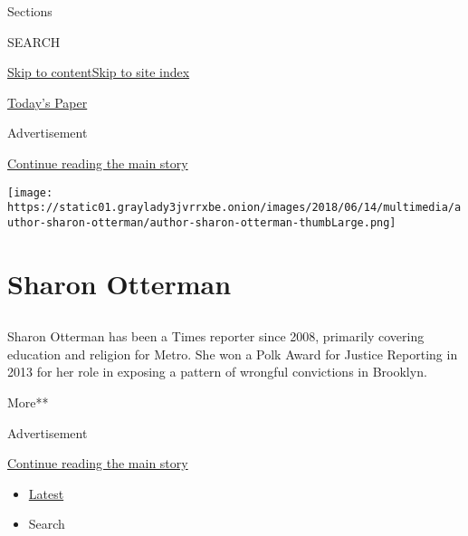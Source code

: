 Sections

SEARCH

\protect\hyperlink{site-content}{Skip to
content}\protect\hyperlink{site-index}{Skip to site index}

\href{https://myaccount.nytimes3xbfgragh.onion/auth/login?response_type=cookie\&client_id=vi}{}

\href{https://www.nytimes3xbfgragh.onion/section/todayspaper}{Today's
Paper}

Advertisement

\protect\hyperlink{after-top}{Continue reading the main story}

\texttt{[image: https://static01.graylady3jvrrxbe.onion/images/2018/06/14/multimedia/author-sharon-otterman/author-sharon-otterman-thumbLarge.png]}

\hypertarget{sharon-otterman}{%
\section{Sharon Otterman}\label{sharon-otterman}}

\subsection{}

Sharon Otterman has been a Times reporter since 2008, primarily covering
education and religion for Metro. She won a Polk Award for Justice
Reporting in 2013 for her role in exposing a pattern of wrongful
convictions in Brooklyn.

More**

Advertisement

\protect\hyperlink{after-mid1}{Continue reading the main story}

\begin{itemize}
\tightlist
\item
  \protect\hyperlink{stream-panel}{Latest}
\item
  Search
\end{itemize}


